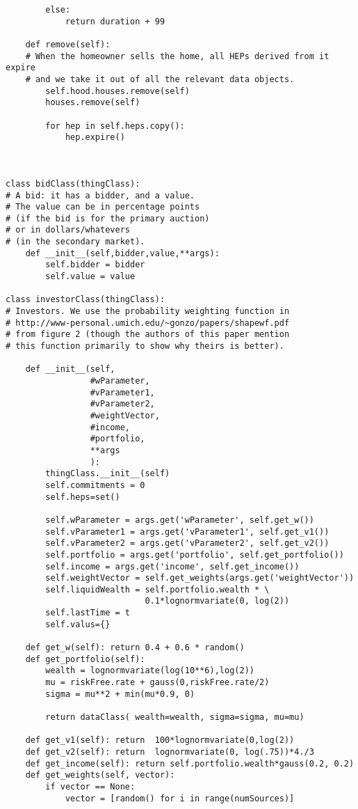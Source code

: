 \begin{lstlisting}
        else:
            return duration + 99

    def remove(self):
    # When the homeowner sells the home, all HEPs derived from it expire
    # and we take it out of all the relevant data objects.
        self.hood.houses.remove(self)
        houses.remove(self)
        
        for hep in self.heps.copy():
            hep.expire()
            
        

class bidClass(thingClass):
# A bid: it has a bidder, and a value.
# The value can be in percentage points
# (if the bid is for the primary auction)
# or in dollars/whatevers
# (in the secondary market).
    def __init__(self,bidder,value,**args):
        self.bidder = bidder
        self.value = value
        
class investorClass(thingClass):
# Investors. We use the probability weighting function in
# http://www-personal.umich.edu/~gonzo/papers/shapewf.pdf
# from figure 2 (though the authors of this paper mention
# this function primarily to show why theirs is better).

    def __init__(self,
                 #wParameter,
                 #vParameter1,
                 #vParameter2,
                 #weightVector,
                 #income,
                 #portfolio,
                 **args
                 ):
        thingClass.__init__(self)
        self.commitments = 0
        self.heps=set()

        self.wParameter = args.get('wParameter', self.get_w())
        self.vParameter1 = args.get('vParameter1', self.get_v1())
        self.vParameter2 = args.get('vParameter2', self.get_v2())
        self.portfolio = args.get('portfolio', self.get_portfolio())
        self.income = args.get('income', self.get_income())
        self.weightVector = self.get_weights(args.get('weightVector'))
        self.liquidWealth = self.portfolio.wealth * \
                            0.1*lognormvariate(0, log(2))
        self.lastTime = t
        self.valus={}

    def get_w(self): return 0.4 + 0.6 * random()
    def get_portfolio(self):
        wealth = lognormvariate(log(10**6),log(2))
        mu = riskFree.rate + gauss(0,riskFree.rate/2)
        sigma = mu**2 + min(mu*0.9, 0)

        return dataClass( wealth=wealth, sigma=sigma, mu=mu)
    
    def get_v1(self): return  100*lognormvariate(0,log(2))
    def get_v2(self): return  lognormvariate(0, log(.75))*4./3
    def get_income(self): return self.portfolio.wealth*gauss(0.2, 0.2)
    def get_weights(self, vector):
        if vector == None:
            vector = [random() for i in range(numSources)]


\end{lstlisting}
